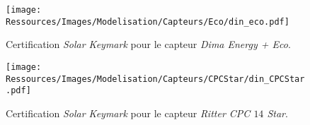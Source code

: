\begin{figure}
    \centering
    \texttt{[image: Ressources/Images/Modelisation/Capteurs/Eco/din\_eco.pdf]}
    \caption[Certification \textit{Solar Keymark} pour le capteur \textit{Dima Energy + Eco}]
            {Certification \textit{Solar Keymark} pour le capteur \textit{Dima Energy + Eco}.}
    \label{fig:caracs_eco}
\end{figure}


\begin{figure}
    \centering
    \texttt{[image: Ressources/Images/Modelisation/Capteurs/CPCStar/din\_CPCStar.pdf]}
    \caption[Certification \textit{Solar Keymark} pour le capteur \textit{Ritter CPC $14$ Star}]
            {Certification \textit{Solar Keymark} pour le capteur \textit{Ritter CPC $14$ Star}.}
    \label{fig:caracs_star}
\end{figure}
